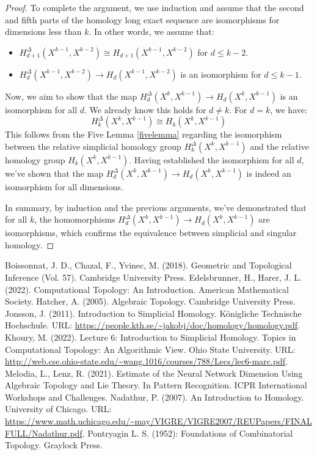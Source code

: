 \documentclass{amsart}
\begin{document}
\begin{proof}
To complete the argument, we use induction and assume that the second and fifth parts of the homology long exact sequence are isomorphisms for dimensions less than $k$. In other words, we assume that:
\begin{itemize}
	\item $H_{d+1}^\Delta(X^{k-1}, X^{k-2}) \cong H_{d+1}(X^{k-1}, X^{k-2})$ for $d \leq k-2$.
	\item $H_d^\Delta(X^{k-1}, X^{k-2}) \rightarrow H_d(X^{k-1}, X^{k-2})$ is an isomorphism for $d \leq k-1$.
\end{itemize}
Now, we aim to show that the map $H_d^\Delta(X^k, X^{k-1}) \rightarrow H_d(X^k, X^{k-1})$ is an isomorphism for all $d$. We already know this holds for $d \neq k$. For $d = k$, we have:
\begin{equation}
H_k^\Delta(X^k,X^{k-1}) \cong H_k(X^k,X^{k-1})
\end{equation}
This follows from the Five Lemma \ref{fivelemma} regarding the isomorphism between the relative simplicial homology group $H_k^\Delta(X^k, X^{k-1})$ and the relative homology group $H_k(X^k, X^{k-1})$. Having established the isomorphism for all $d$, we've shown that the map 
$H_d^\Delta(X^k, X^{k-1}) \rightarrow H_d(X^k, X^{k-1})$ is indeed an isomorphism for all dimensions.

In summary, by induction and the previous arguments, we've demonstrated that for all $k$, the homomorphisms $H_d^\Delta(X^k, X^{k-1}) \rightarrow H_d(X^k, X^{k-1})$ are isomorphisms, which confirms the equivalence between simplicial and singular homology.
\end{proof}

\begin{thebibliography}{100}
 Boissonnat, J. D., Chazal, F., Yvinec, M. (2018). Geometric and Topological Inference (Vol. 57). Cambridge University Press.
 Edelsbrunner, H., Harer, J. L. (2022). Computational Topology: An Introduction. American Mathematical Society.
 Hatcher, A. (2005). Algebraic Topology. Cambridge University Press.
 Jonsson, J. (2011). Introduction to Simplicial Homology. Königliche Technische Hochschule. URL: \url{https://people.kth.se/~jakobj/doc/homology/homology.pdf}.
 Khoury, M. (2022). Lecture 6: Introduction to Simplicial Homology. Topics in Computational Topology: An Algorithmic View. Ohio State University. URL: \url{http://web.cse.ohio-state.edu/~wang.1016/courses/788/Lecs/lec6-marc.pdf}.
 Melodia, L., Lenz, R. (2021). Estimate of the Neural Network Dimension Using Algebraic Topology and Lie Theory. In Pattern Recognition. ICPR International Workshops and Challenges.
 Nadathur, P. (2007). An Introduction to Homology. University of Chicago. URL: \url{https://www.math.uchicago.edu/~may/VIGRE/VIGRE2007/REUPapers/FINALFULL/Nadathur.pdf}.
 Pontryagin L. S. (1952): Foundations of Combinatorial Topology. Graylock Press.
\end{thebibliography}
\end{document}
